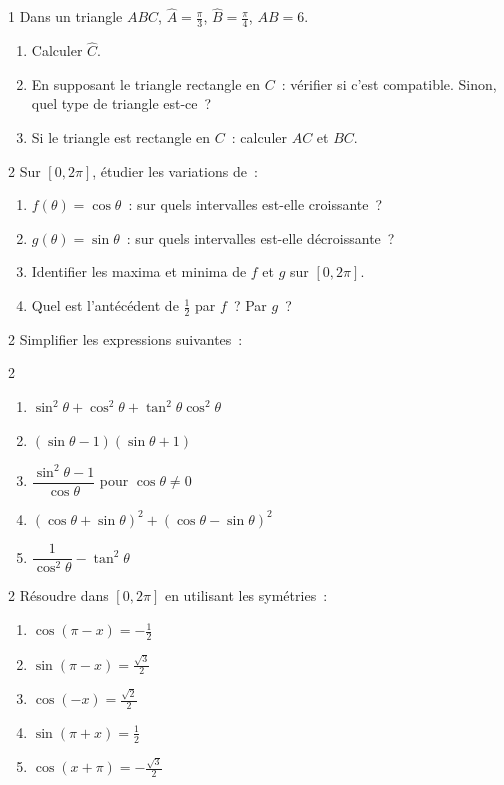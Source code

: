 \begin{exo}{1}
Dans un triangle $ABC$, $\widehat{A}=\frac{\pi}{3}$, $\widehat{B}=\frac{\pi}{4}$, $AB=6$.
\begin{enumerate}
  \item Calculer $\widehat{C}$.
  \item En supposant le triangle rectangle en $C$~: v\'erifier si c'est
        compatible. Sinon, quel type de triangle est-ce~?
  \item Si le triangle est rectangle en $C$~: calculer $AC$ et $BC$.
\end{enumerate}
\end{exo}

\begin{exo}{2}
Sur {$[0,2\pi]$}, \'etudier les variations de~:
\begin{enumerate}
  \item $f(\theta)=\cos\theta$~: sur quels intervalles est-elle croissante~?
  \item $g(\theta)=\sin\theta$~: sur quels intervalles est-elle d\'ecroissante~?
  \item Identifier les maxima et minima de $f$ et $g$ sur {$[0,2\pi]$}.
  \item Quel est l'ant\'ec\'edent de $\frac{1}{2}$ par $f$~? Par $g$~?
\end{enumerate}
\end{exo}

\begin{exo}{2}
Simplifier les expressions suivantes~:
\begin{multicols}{2}
\begin{enumerate}
  \item $\sin^2\theta+\cos^2\theta+\tan^2\theta\cos^2\theta$
  \item $(\sin\theta-1)(\sin\theta+1)$
  \item $\dfrac{\sin^2\theta-1}{\cos\theta}$ pour $\cos\theta\ne0$
  \item $(\cos\theta+\sin\theta)^2+(\cos\theta-\sin\theta)^2$
  \item $\dfrac{1}{\cos^2\theta}-\tan^2\theta$
\end{enumerate}
\end{multicols}
\end{exo}

\begin{exo}{2}
R\'esoudre dans {$[0,2\pi]$} en utilisant les sym\'etries~:
\begin{enumerate}
  \item $\cos(\pi-x) = -\frac{1}{2}$
  \item $\sin(\pi-x) = \frac{\sqrt{3}}{2}$
  \item $\cos(-x) = \frac{\sqrt{2}}{2}$
  \item $\sin(\pi+x) = \frac{1}{2}$
  \item $\cos(x+\pi) = -\frac{\sqrt{3}}{2}$
\end{enumerate}
\end{exo}

